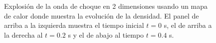 \documentclass[12pt,a4paper]{book}
\begin{document}
\begin{figure}
    \caption{Explosión de la onda de choque en 2 dimensiones usando un mapa de calor donde muestra
    la evolución de la densidad. El panel de arriba a la izquierda muestra el tiempo inicial $t=0$ s,
    el de arriba a la derecha  al $t = 0.2$ s y el de abajo al tiempo $t = 0.4$ s. 
    \label{fig:head_map}}
\end{figure}



\end{document}
